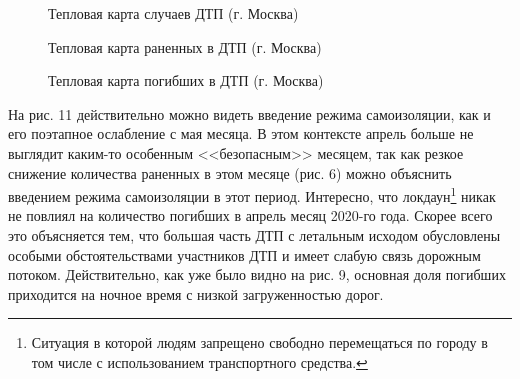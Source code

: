 \documentclass[a4paper, 14pt]{article}
\begin{document}
\begin{figure}[h]
	\caption{Тепловая карта случаев ДТП (г. Москва)}
\end{figure}

\begin{figure}[h]
	\caption{Тепловая карта раненных в ДТП (г. Москва)}
\end{figure}

\begin{figure}[h]
	\caption{Тепловая карта погибших в ДТП (г. Москва)}
\end{figure}

На рис. 11 действительно можно видеть введение режима самоизоляции, как и его поэтапное ослабление с мая месяца. В этом контексте апрель больше не выглядит каким-то особенным <<безопасным>> месяцем, так как резкое снижение количества раненных в этом месяце (рис. 6) можно объяснить введением режима самоизоляции в этот период. Интересно, что локдаун\footnote{Ситуация в которой людям запрещено свободно перемещаться по городу в том числе с использованием транспортного средства.} никак не повлиял на количество погибших в апрель месяц 2020-го года. Скорее всего это объясняется тем, что большая часть ДТП с летальным исходом обусловлены особыми обстоятельствами участников ДТП и имеет слабую связь дорожным потоком. Действительно, как уже было видно на рис. 9, основная доля погибших приходится на ночное время с низкой загруженностью дорог. 	
\end{document}

